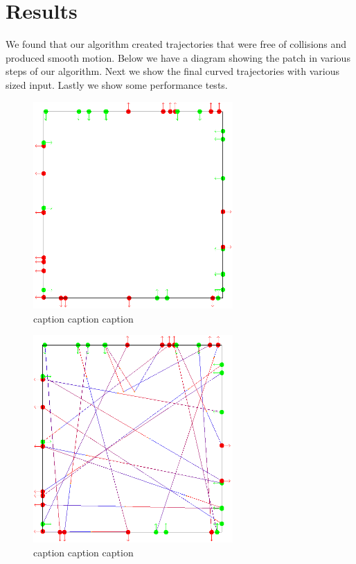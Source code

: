 \section{Results}
\label{sec:results}

We found that our algorithm created trajectories that were free of collisions and produced smooth motion. Below we have a diagram showing the patch in various steps of our algorithm. Next we show the final curved trajectories with various sized input. Lastly we show some performance tests.


\begin{figure}[H]
 \centering
 \includegraphics[width=3in]{images/steps-input.png}
 \caption{caption caption caption}
\end{figure}

\begin{figure}[H]
 \centering
 \includegraphics[width=3in]{images/steps-connected.png}
 \caption{caption caption caption}
\end{figure}

